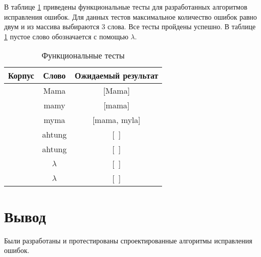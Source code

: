 В таблице \ref{tbl:func_tests} приведены функциональные тесты для разработанных алгоритмов исправления ошибок. Для данных тестов максимальное количество ошибок равно двум и из массива выбираются 3 слова. Все тесты пройдены успешно. В таблице \ref{tbl:func_tests} пустое слово обозначается с помощью $\lambda$.

\begin{table}[ht]
	\small
	\begin{center}
		\begin{threeparttable}
			\caption{Функциональные тесты}
			\label{tbl:func_tests}
			\begin{tabular}{|c|c|c|}
				\hline
				\bfseries Корпус
				& \bfseries Слово
				& \bfseries Ожидаемый результат \\ 
				\hline
				[Mama, Myla, Ramu] & Mama & [Mama] \\
				\hline
				[Mama, Myla, Ramu]  & mamy & [mama] \\
				\hline
				[Mama, Myla, Ramu]  & myma & [mama, myla] \\
				\hline
				[Mama, Myla, Ramu]  & ahtung & [~] \\
				\hline
				[~]  & ahtung & [~] \\
				\hline
				[~]  & $\lambda$ & [~] \\
				\hline
				[Мама, Мыла, Раму]  & $\lambda$ & [~] \\
				\hline
			\end{tabular}	
		\end{threeparttable}	
	\end{center}
\end{table}


\section*{Вывод}
Были разработаны и протестированы спроектированные алгоритмы исправления ошибок.

